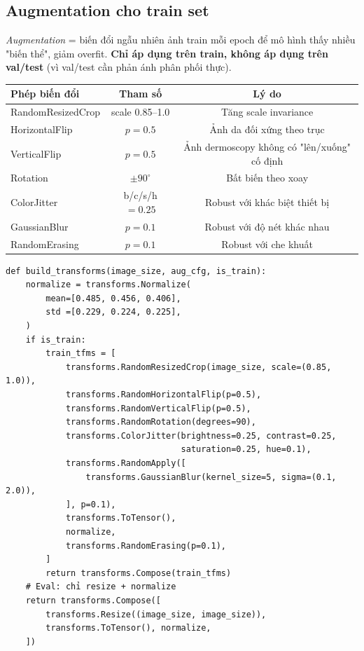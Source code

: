 \documentclass[11pt,a4paper]{article}
\begin{document}
\subsection{Augmentation cho train set}

\textit{Augmentation} = biến đổi ngẫu nhiên ảnh train mỗi epoch để mô hình thấy nhiều "biến thể", giảm overfit. \textbf{Chỉ áp dụng trên train, không áp dụng trên val/test} (vì val/test cần phản ánh phân phối thực).

\begin{table}[h]
\centering\small
\begin{tabular}{lcc}
\toprule
\textbf{Phép biến đổi} & \textbf{Tham số} & \textbf{Lý do} \\
\midrule
RandomResizedCrop & scale 0.85--1.0   & Tăng scale invariance \\
HorizontalFlip    & $p=0.5$            & Ảnh da đối xứng theo trục \\
VerticalFlip      & $p=0.5$            & Ảnh dermoscopy không có "lên/xuống" cố định \\
Rotation          & $\pm 90^\circ$     & Bất biến theo xoay \\
ColorJitter       & b/c/s/h $= 0.25$   & Robust với khác biệt thiết bị \\
GaussianBlur      & $p=0.1$            & Robust với độ nét khác nhau \\
RandomErasing     & $p=0.1$            & Robust với che khuất \\
\bottomrule
\end{tabular}
\end{table}

\begin{lstlisting}[caption={\texttt{src/data/transforms.py} --- pipeline augmentation}]
def build_transforms(image_size, aug_cfg, is_train):
    normalize = transforms.Normalize(
        mean=[0.485, 0.456, 0.406],
        std =[0.229, 0.224, 0.225],
    )
    if is_train:
        train_tfms = [
            transforms.RandomResizedCrop(image_size, scale=(0.85, 1.0)),
            transforms.RandomHorizontalFlip(p=0.5),
            transforms.RandomVerticalFlip(p=0.5),
            transforms.RandomRotation(degrees=90),
            transforms.ColorJitter(brightness=0.25, contrast=0.25,
                                   saturation=0.25, hue=0.1),
            transforms.RandomApply([
                transforms.GaussianBlur(kernel_size=5, sigma=(0.1, 2.0)),
            ], p=0.1),
            transforms.ToTensor(),
            normalize,
            transforms.RandomErasing(p=0.1),
        ]
        return transforms.Compose(train_tfms)
    # Eval: chỉ resize + normalize
    return transforms.Compose([
        transforms.Resize((image_size, image_size)),
        transforms.ToTensor(), normalize,
    ])
\end{lstlisting}
\end{document}
